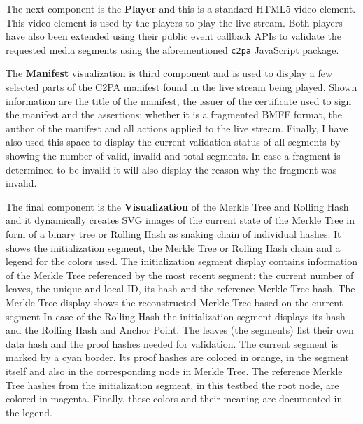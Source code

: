 The next component is the \textbf{Player} and this is a standard HTML5 video element. This video element is used by the players to play the live stream. Both players have also been extended using their public event callback APIs to validate the requested media segments using the aforementioned \texttt{c2pa} JavaScript package.

The \textbf{Manifest} visualization is third component and is used to display a few selected parts of the C2PA manifest found in the live stream being played. Shown information are the title of the manifest, the issuer of the certificate used to sign the manifest and the assertions: whether it is a fragmented BMFF format, the author of the manifest and all actions applied to the live stream. Finally, I have also used this space to display the current validation status of all segments by showing the number of valid, invalid and total segments. In case a fragment is determined to be invalid it will also display the reason why the fragment was invalid.

The final component is the \textbf{Visualization} of the Merkle Tree and Rolling Hash and it dynamically creates SVG images of the current state of the Merkle Tree in form of a binary tree or Rolling Hash as snaking chain of individual hashes. It shows the initialization segment, the Merkle Tree or Rolling Hash chain and a legend for the colors used. The initialization segment display contains information of the Merkle Tree referenced by the most recent segment: the current number of leaves, the unique and local ID, its hash and the reference Merkle Tree hash. The Merkle Tree display shows the reconstructed Merkle Tree based on the current segment In case of the Rolling Hash the initialization segment displays its hash and the Rolling Hash and Anchor Point. The leaves (the segments) list their own data hash and the proof hashes needed for validation. The current segment is marked by a cyan border. Its proof hashes are colored in orange, in the segment itself and also in the corresponding node in Merkle Tree. The reference Merkle Tree hashes from the initialization segment, in this testbed the root node, are colored in magenta. Finally, these colors and their meaning are documented in the legend.
